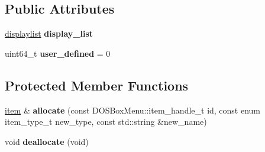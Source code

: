 \subsection*{Public Attributes}
\begin{DoxyCompactItemize}
\item 
\hypertarget{classDOSBoxMenu_1_1item_a22a843c9d2a6a27d0a77c079a7e59d79}{\hyperlink{classDOSBoxMenu_1_1displaylist}{displaylist} {\bfseries display\-\_\-list}}\label{classDOSBoxMenu_1_1item_a22a843c9d2a6a27d0a77c079a7e59d79}

\item 
\hypertarget{classDOSBoxMenu_1_1item_a4b00500eb6e5297c61f7afb5ba4526ff}{uint64\-\_\-t {\bfseries user\-\_\-defined} = 0}\label{classDOSBoxMenu_1_1item_a4b00500eb6e5297c61f7afb5ba4526ff}

\end{DoxyCompactItemize}
\subsection*{Protected Member Functions}
\begin{DoxyCompactItemize}
\item 
\hypertarget{classDOSBoxMenu_1_1item_af0466fa387fe6de1adb0d6a807414c97}{\hyperlink{classDOSBoxMenu_1_1item}{item} \& {\bfseries allocate} (const D\-O\-S\-Box\-Menu\-::item\-\_\-handle\-\_\-t id, const enum item\-\_\-type\-\_\-t new\-\_\-type, const std\-::string \&new\-\_\-name)}\label{classDOSBoxMenu_1_1item_af0466fa387fe6de1adb0d6a807414c97}

\item 
\hypertarget{classDOSBoxMenu_1_1item_aedd2ca7c35a1a8e4bd3ede9c9dcc7213}{void {\bfseries deallocate} (void)}\label{classDOSBoxMenu_1_1item_aedd2ca7c35a1a8e4bd3ede9c9dcc7213}

\end{DoxyCompactItemize}
